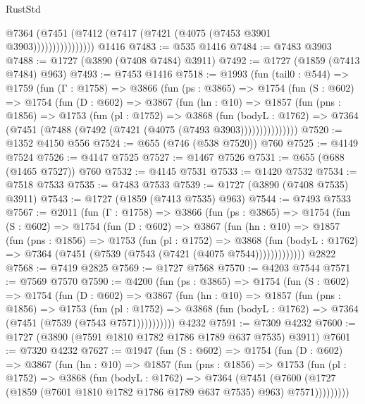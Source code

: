 \begin{lexlean}{RustStd}
\begin{coremodule}
                      @7364 (@7451 (@7412 (@7417 (@7421 (@4075 (@7453 @3901 @3903))))))))))))))))
    @1416
@7483 := @535 @1416
@7484 := @7483 @3903
@7488 := @1727 (@3890 (@7408 @7484) @3911)
@7492 := @1727 (@1859 (@7413 @7484) @963)
@7493 := @7453 @1416
@7518 := @1993
    (fun (tail0 : @544) =>
    @1759
      (fun (Γ : @1758) =>
      @3866
        (fun (ps : @3865) =>
        @1754
          (fun (S : @602) =>
          @1754
            (fun (D : @602) =>
            @3867
              (fun (hn : @10) =>
              @1857
                (fun (pns : @1856) =>
                @1753
                  (fun (pl : @1752) =>
                  @3868
                    (fun (bodyL : @1762) =>
                    @7364 (@7451 (@7488 (@7492 (@7421 (@4075 (@7493 @3903)))))))))))))))
@7520 := @1352 @4150 @556
@7524 := @655 (@746 (@538 @7520)) @760
@7525 := @4149 @7524
@7526 := @4147 @7525
@7527 := @1467 @7526
@7531 := @655 (@688 (@1465 @7527)) @760
@7532 := @4145 @7531
@7533 := @1420 @7532
@7534 := @7518 @7533
@7535 := @7483 @7533
@7539 := @1727 (@3890 (@7408 @7535) @3911)
@7543 := @1727 (@1859 (@7413 @7535) @963)
@7544 := @7493 @7533
@7567 := @2011
    (fun (Γ : @1758) =>
    @3866
      (fun (ps : @3865) =>
      @1754
        (fun (S : @602) =>
        @1754
          (fun (D : @602) =>
          @3867
            (fun (hn : @10) =>
            @1857
              (fun (pns : @1856) =>
              @1753
                (fun (pl : @1752) =>
                @3868
                  (fun (bodyL : @1762) =>
                  @7364 (@7451 (@7539 (@7543 (@7421 (@4075 @7544)))))))))))))
    @2822
@7568 := @7419 @2825
@7569 := @1727 @7568
@7570 := @4203 @7544
@7571 := @7569 @7570
@7590 := @4200
    (fun (ps : @3865) =>
    @1754
      (fun (S : @602) =>
      @1754
        (fun (D : @602) =>
        @3867
          (fun (hn : @10) =>
          @1857
            (fun (pns : @1856) =>
            @1753
              (fun (pl : @1752) =>
              @3868 (fun (bodyL : @1762) => @7364 (@7451 (@7539 (@7543 @7571))))))))))
    @4232
@7591 := @7309 @4232
@7600 := @1727 (@3890 (@7591 @1810 @1782 @1786 @1789 @637 @7535) @3911)
@7601 := @7320 @4232
@7627 := @1947
    (fun (S : @602) =>
    @1754
      (fun (D : @602) =>
      @3867
        (fun (hn : @10) =>
        @1857
          (fun (pns : @1856) =>
          @1753
            (fun (pl : @1752) =>
            @3868
              (fun (bodyL : @1762) =>
              @7364
                (@7451
                  (@7600
                    (@1727 (@1859 (@7601 @1810 @1782 @1786 @1789 @637 @7535) @963) @7571)))))))))

\end{coremodule}
\end{lexlean}
